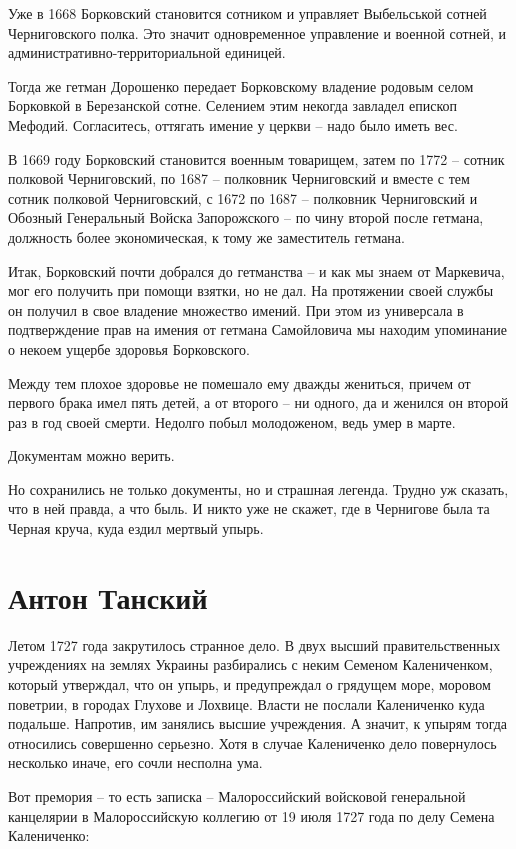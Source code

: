 \documentclass[a5paper,11pt,openany]{article}
\begin{document}
   Уже в 1668 Борковский становится сотником и управляет Выбельськой сотней Черниговского полка. Это значит одновременное управление и военной сотней, и административно-территориальной единицей.

   Тогда же гетман Дорошенко передает Борковскому владение родовым селом Борковкой в Березанской сотне. Селением этим некогда завладел епископ Мефодий. Согласитесь, оттягать имение у церкви – надо было иметь вес.

   В 1669 году Борковский становится военным товарищем, затем по 1772 – сотник полковой Черниговский, по 1687 – полковник Черниговский и вместе с тем сотник полковой Черниговский, с 1672 по 1687 – полковник Черниговский и Обозный Генеральный Войска Запорожского – по чину второй после гетмана, должность более экономическая, к тому же заместитель гетмана.

   Итак, Борковский почти добрался до гетманства – и как мы знаем от Маркевича, мог его получить при помощи взятки, но не дал. На протяжении своей службы он получил в свое владение множество имений. При этом из универсала в подтверждение прав на имения от гетмана Самойловича мы находим упоминание о некоем ущербе здоровья Борковского.

   Между тем плохое здоровье не помешало ему дважды жениться, причем от первого брака имел пять детей, а от второго – ни одного, да и женился он второй раз в год своей смерти. Недолго побыл молодоженом, ведь умер в марте.

   Документам можно верить.

   Но сохранились не только документы, но и страшная легенда. Трудно уж сказать, что в ней правда, а что быль. И никто уже не скажет, где в Чернигове была та Черная круча, куда ездил мертвый упырь.


\section{Антон Танский}

    Летом 1727 года закрутилось странное дело. В двух высший правительственных учреждениях на землях Украины разбирались с неким Семеном Калениченком, который утверждал, что он упырь, и предупреждал о грядущем море, моровом поветрии, в городах Глухове и Лохвице. Власти не послали Калениченко куда подальше. Напротив, им занялись высшие учреждения. А значит, к упырям тогда относились совершенно серьезно. Хотя в случае Калениченко дело повернулось несколько иначе, его сочли несполна ума.

   Вот премория – то есть записка – Малороссийский войсковой генеральной канцелярии в Малороссийскую коллегию от 19 июля 1727 года по делу Семена Калениченко:
\end{document}
